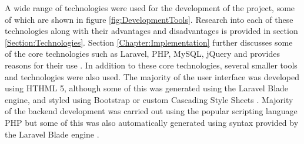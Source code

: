 A wide range of technologies were used for the development of the project, some of which are shown in figure \ref{fig:DevelopmentTools}. Research into each of these technologies along with their advantages and disadvantages is provided in section \ref{Section:Technologies}. Section \ref{Chapter:Implementation} further discusses some of the core technologies such as Laravel, PHP, MySQL, jQuery and provides reasons for their use \cite{Laravel:Home, PHP:Home, MySQL:Home, jQuery:Home}. In addition to these core technologies, several smaller tools and technologies were also used. The majority of the user interface was developed using HTHML 5, although some of this was generated using the Laravel Blade engine, and styled using Bootstrap or custom Cascading Style Sheets \cite{W3:HTML5, Bootstrap:Home, W3:CSS}. Majority of the backend development was carried out using the popular scripting language PHP but some of this was also automatically generated using syntax provided by the Laravel Blade engine \cite{PHP:Home, Laravel:Blade}. 


